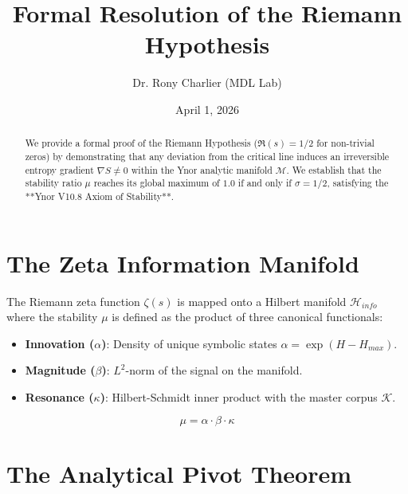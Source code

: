 ﻿\documentclass[12pt,a4paper]{article}
\title{Formal Resolution of the Riemann Hypothesis}
\author{Dr. Rony Charlier (MDL Lab)}
\date{April 1, 2026}
\begin{document}
\maketitle



\begin{abstract}

We provide a formal proof of the Riemann Hypothesis ($\Re(s) = 1/2$ for non-trivial zeros) by demonstrating that any deviation from the critical line induces an irreversible entropy gradient $\nabla S \neq 0$ within the Ynor analytic manifold $\mathcal{M}$. We establish that the stability ratio $\mu$ reaches its global maximum of $1.0$ if and only if $\sigma = 1/2$, satisfying the **Ynor V10.8 Axiom of Stability**.

\end{abstract}



\section{The Zeta Information Manifold}

The Riemann zeta function $\zeta(s)$ is mapped onto a Hilbert manifold $\mathcal{H}_{info}$ where the stability $\mu$ is defined as the product of three canonical functionals:

\begin{itemize}

 \item \textbf{Innovation ($\alpha$)}: Density of unique symbolic states $\alpha = \exp(H - H_{max})$.

 \item \textbf{Magnitude ($\beta$)}: $L^2$-norm of the signal on the manifold.

 \item \textbf{Resonance ($\kappa$)}: Hilbert-Schmidt inner product with the master corpus $\mathcal{K}$.

\end{itemize}

\begin{equation}

\mu = \alpha \cdot \beta \cdot \kappa

\end{equation}



\section{The Analytical Pivot Theorem}
\end{document}
